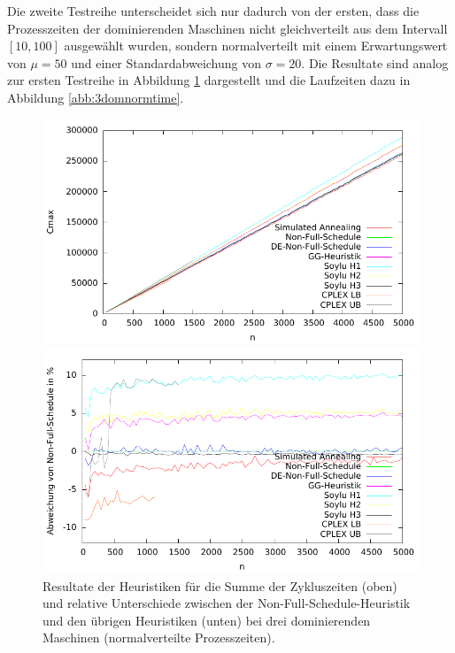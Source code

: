 \documentclass{scrreprt}
\begin{document}
Die zweite Testreihe unterscheidet sich nur dadurch von der ersten, dass die Prozesszeiten der dominierenden Maschinen nicht gleichverteilt aus dem Intervall
$[10,100]$ ausgewählt wurden, sondern normalverteilt mit einem Erwartungswert von $\mu=50$ und einer Standardabweichung von $\sigma=20$.
Die Resultate sind analog zur ersten Testreihe in Abbildung \ref{abb:3domnorm} dargestellt und die Laufzeiten dazu in Abbildung \ref{abb:3domnormtime}.
\begin{figure}
    \begin{center}
        \includegraphics[width=.8\textwidth]{../instances/3dom_norm/plot.pdf}
    \end{center}
    \begin{center}
        \includegraphics[width=.8\textwidth]{../instances/3dom_norm/plotrel.pdf}
    \end{center}
    \caption{
        \label{abb:3domnorm}
        Resultate der Heuristiken für die Summe der Zykluszeiten (oben) 
        und relative Unterschiede zwischen der Non-Full-Schedule-Heuristik und den übrigen Heuristiken (unten) 
        bei drei dominierenden Maschinen (normalverteilte Prozesszeiten).
    }
\end{figure}
\end{document}
